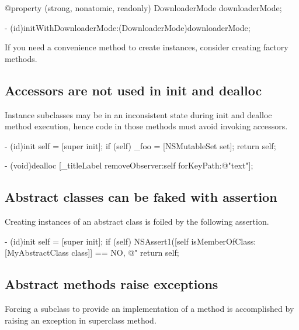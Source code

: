 \documentclass[10pt]{extarticle}
\newenvironment{codelisting}
{\footnotesize\mdframed[middlelinewidth=0.5pt, middlelinecolor=BaliHaiColor, skipabove=15pt]\verbatim}
{\endverbatim\endmdframed\vspace{12pt}\normalsize}
\newenvironment{tiplisting}
{\small\mdframed[middlelinewidth=0.5pt, middlelinecolor=GoldenDreamColor, skipabove=15pt]{\textbf{Tip:}}}
{\endmdframed\vspace{12pt}\normalsize}
\begin{document}
\begin{codelisting}
@property (strong, nonatomic, readonly) DownloaderMode downloaderMode;

- (id)initWithDownloaderMode:(DownloaderMode)downloaderMode;
\end{codelisting}

\begin{tiplisting}
If you need a convenience method to create instances, consider creating factory methods.
\end{tiplisting}


\subsection{Accessors are not used in init and dealloc}

Instance subclasses may be in an inconsistent state during init and dealloc method execution, hence code in those methods must avoid invoking accessors.

\begin{codelisting}
- (id)init
{
    self = [super init];
    if (self) {
        _foo = [NSMutableSet set];
    }
    return self;
}

- (void)dealloc
{
    [_titleLabel removeObserver:self forKeyPath:@"text"];
}
\end{codelisting}


\subsection{Abstract classes can be faked with assertion}

Creating instances of an abstract class is foiled by the following assertion.

\begin{codelisting}
- (id)init
{
    self = [super init];
    if (self) {
        NSAssert1([self isMemberOfClass:[MyAbstractClass class]] == NO,
                  @"%
    }
    return self;
}
\end{codelisting}


\subsection{Abstract methods raise exceptions}

Forcing a subclass to provide an implementation of a method is accomplished by raising an exception in superclass method.
\end{document}
